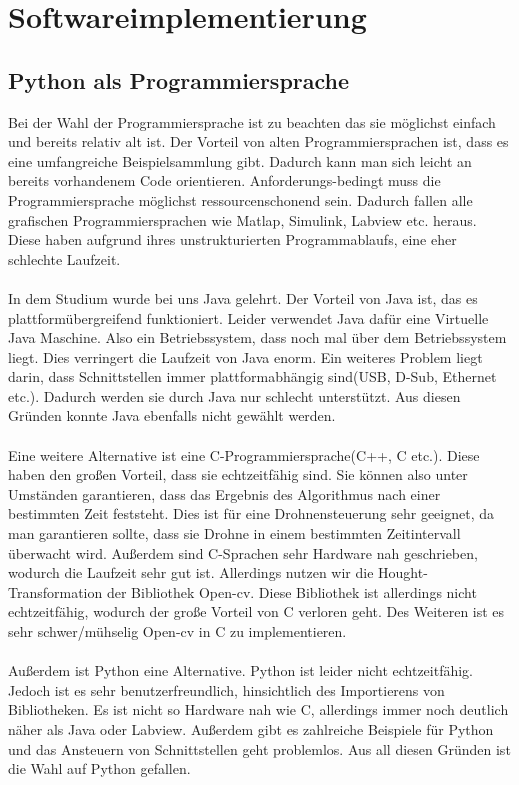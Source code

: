 \section{Softwareimplementierung}
\subsection{Python als Programmiersprache}

Bei der Wahl der Programmiersprache ist zu beachten das sie möglichst einfach und bereits relativ alt ist. Der Vorteil von alten Programmiersprachen ist, dass es eine umfangreiche Beispielsammlung gibt. Dadurch kann man sich leicht an bereits vorhandenem Code orientieren.
Anforderungs-bedingt muss die Programmiersprache möglichst ressourcenschonend sein.
Dadurch fallen alle grafischen Programmiersprachen wie Matlap, Simulink, Labview etc. heraus. Diese haben aufgrund ihres unstrukturierten Programmablaufs, eine eher schlechte Laufzeit.\\ 
\\
In dem Studium wurde bei uns Java gelehrt. Der Vorteil von Java ist, das es plattformübergreifend funktioniert. Leider verwendet Java dafür eine Virtuelle Java Maschine. Also ein Betriebssystem, dass noch mal über dem Betriebssystem liegt. Dies verringert die Laufzeit von Java enorm. Ein weiteres Problem liegt darin, dass Schnittstellen immer plattformabhängig sind(USB, D-Sub, Ethernet etc.). Dadurch werden sie durch Java nur schlecht unterstützt. Aus diesen Gründen konnte Java ebenfalls nicht gewählt werden.\\
\\
Eine weitere Alternative ist eine C-Programmiersprache(C++, C etc.). Diese haben den großen Vorteil, dass sie echtzeitfähig sind. Sie können also unter Umständen garantieren, dass das Ergebnis des Algorithmus nach einer bestimmten Zeit feststeht. Dies ist für eine Drohnensteuerung sehr geeignet, da man garantieren sollte, dass sie Drohne in einem bestimmten Zeitintervall überwacht wird. Außerdem sind C-Sprachen sehr Hardware nah geschrieben, wodurch die Laufzeit sehr gut ist. Allerdings nutzen wir die Hought-Transformation der Bibliothek Open-cv. Diese Bibliothek ist allerdings nicht echtzeitfähig, wodurch der große Vorteil von C verloren geht. Des Weiteren ist es sehr schwer/mühselig Open-cv in C zu implementieren.\\
\\
Außerdem ist Python eine Alternative. Python ist leider nicht echtzeitfähig. Jedoch ist es sehr benutzerfreundlich, hinsichtlich des Importierens von Bibliotheken. Es ist nicht so Hardware nah wie C, allerdings immer noch deutlich näher als Java oder Labview. Außerdem gibt es zahlreiche Beispiele für Python und das Ansteuern von Schnittstellen geht problemlos. Aus all diesen Gründen ist die Wahl auf Python gefallen.
